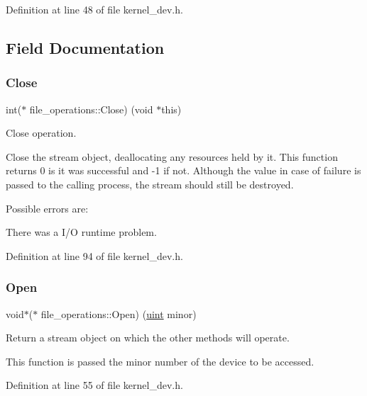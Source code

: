 Definition at line 48 of file kernel\+\_\+dev.\+h.



\subsection{Field Documentation}
\mbox{\label{structfile__operations_a66cfe706a1a29e3e58c7694dbd801b0f}} 
\subsubsection{\texorpdfstring{Close}{Close}}
{\footnotesize\ttfamily int($\ast$ file\+\_\+operations\+::\+Close) (void $\ast$this)}



Close operation. 

Close the stream object, deallocating any resources held by it. This function returns 0 is it was successful and -\/1 if not. Although the value in case of failure is passed to the calling process, the stream should still be destroyed.

Possible errors are\+:
\begin{DoxyItemize}
\item There was a I/O runtime problem. 
\end{DoxyItemize}

Definition at line 94 of file kernel\+\_\+dev.\+h.

\mbox{\label{structfile__operations_a2732da2af03e1fc7ba0b63a529ab1411}} 
\subsubsection{\texorpdfstring{Open}{Open}}
{\footnotesize\ttfamily void$\ast$($\ast$ file\+\_\+operations\+::\+Open) (\hyperlink{bios_8h_a91ad9478d81a7aaf2593e8d9c3d06a14}{uint} minor)}



Return a stream object on which the other methods will operate. 

This function is passed the minor number of the device to be accessed. 

Definition at line 55 of file kernel\+\_\+dev.\+h.

